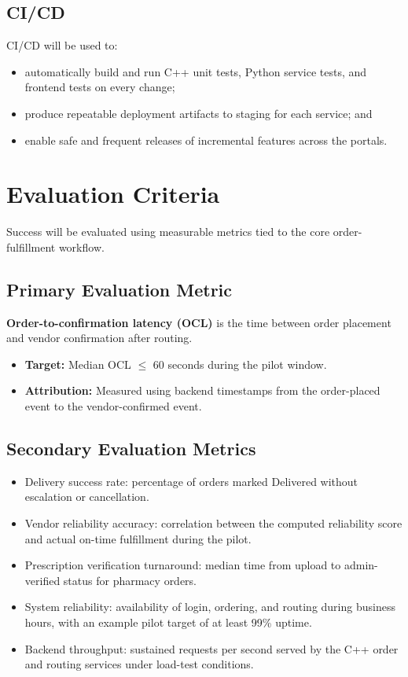 \documentclass[11pt,a4paper]{article}
\begin{document}
\subsection{CI/CD}

CI/CD will be used to:

\begin{itemize}[leftmargin=1.5em]
    \item automatically build and run C++ unit tests, Python service tests, and frontend tests
    on every change;
    \item produce repeatable deployment artifacts to staging for each service; and
    \item enable safe and frequent releases of incremental features across the portals.
\end{itemize}

\section{Evaluation Criteria}

Success will be evaluated using measurable metrics tied to the core order-fulfillment workflow.

\subsection{Primary Evaluation Metric}

\textbf{Order-to-confirmation latency (OCL)} is the time between order placement and vendor
confirmation after routing.

\begin{itemize}[leftmargin=1.5em]
    \item \textbf{Target:} Median OCL $\leq$ 60 seconds during the pilot window.
    \item \textbf{Attribution:} Measured using backend timestamps from the order-placed event
    to the vendor-confirmed event.
\end{itemize}

\subsection{Secondary Evaluation Metrics}

\begin{itemize}[leftmargin=1.5em]
    \item Delivery success rate: percentage of orders marked Delivered without escalation or cancellation.
    \item Vendor reliability accuracy: correlation between the computed reliability score and
    actual on-time fulfillment during the pilot.
    \item Prescription verification turnaround: median time from upload to admin-verified status
    for pharmacy orders.
    \item System reliability: availability of login, ordering, and routing during business hours,
    with an example pilot target of at least 99\% uptime.
    \item Backend throughput: sustained requests per second served by the C++ order and routing
    services under load-test conditions.
\end{itemize}
\end{document}
